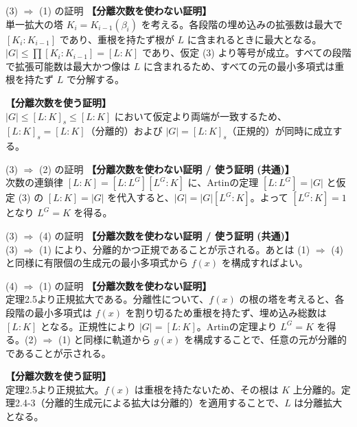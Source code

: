 \documentclass[11pt,dvipsnames]{beamer}
\begin{document}

\begin{frame}[allowframebreaks]{(3) $\Rightarrow$ (1) の証明}
    \textbf{【分離次数を使わない証明】}\\
    単一拡大の塔 $K_i = K_{i-1}(\beta_i)$ を考える。各段階の埋め込みの拡張数は最大で $[K_i:K_{i-1}]$ であり、重根を持たず根が $L$ に含まれるときに最大となる。$|G| \le \prod [K_i:K_{i-1}] = [L:K]$ であり、仮定 (3) より等号が成立。すべての段階で拡張可能数は最大かつ像は $L$ に含まれるため、すべての元の最小多項式は重根を持たず $L$ で分解する。

    \vspace{1em}
    \textbf{【分離次数を使う証明】}\\
    $|G| \le [L:K]_s \le [L:K]$ において仮定より両端が一致するため、$[L:K]_s = [L:K]$（分離的）および $|G| = [L:K]_s$（正規的）が同時に成立する。
\end{frame}

\begin{frame}[allowframebreaks]{(3) $\Rightarrow$ (2) の証明}
    \textbf{【分離次数を使わない証明 / 使う証明 (共通)】}\\
    次数の連鎖律 $[L:K] = [L:L^G][L^G:K]$ に、Artinの定理 $[L:L^G] = |G|$ と仮定 (3) の $[L:K] = |G|$ を代入すると、$|G| = |G| [L^G:K]$。よって $[L^G:K] = 1$ となり $L^G = K$ を得る。
\end{frame}

\begin{frame}[allowframebreaks]{(3) $\Rightarrow$ (4) の証明}
    \textbf{【分離次数を使わない証明 / 使う証明 (共通)】}\\
    (3) $\Rightarrow$ (1) により、分離的かつ正規であることが示される。あとは (1) $\Rightarrow$ (4) と同様に有限個の生成元の最小多項式から $f(x)$ を構成すればよい。
\end{frame}


\begin{frame}[allowframebreaks]{(4) $\Rightarrow$ (1) の証明}
    \textbf{【分離次数を使わない証明】}\\
    定理2.5より正規拡大である。分離性について、$f(x)$ の根の塔を考えると、各段階の最小多項式は $f(x)$ を割り切るため重根を持たず、埋め込み総数は $[L:K]$ となる。正規性により $|G| = [L:K]$。Artinの定理より $L^G = K$ を得る。(2) $\Rightarrow$ (1) と同様に軌道から $g(x)$ を構成することで、任意の元が分離的であることが示される。

    \vspace{1em}
    \textbf{【分離次数を使う証明】}\\
    定理2.5より正規拡大。$f(x)$ は重根を持たないため、その根は $K$ 上分離的。定理2.4-3（分離的生成元による拡大は分離的）を適用することで、$L$ は分離拡大となる。
\end{frame}
\end{document}
